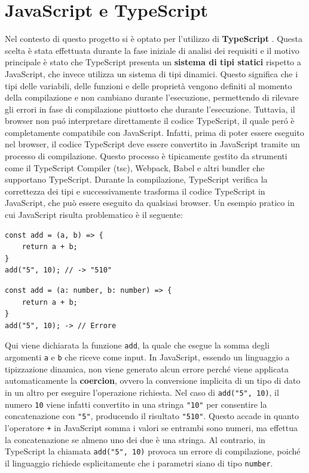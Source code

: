 \documentclass[target=bach,aauheader=,style=]{thud}
\begin{document}
\section{JavaScript e TypeScript}
Nel contesto di questo progetto si è optato per l'utilizzo di \textbf{TypeScript} \cite{wikipedia:typescript}. Questa scelta è stata effettuata durante la fase iniziale di analisi dei requisiti e il motivo principale è stato che TypeScript presenta un \textbf{sistema di tipi statici} rispetto a JavaScript, che invece utilizza un sistema di tipi dinamici. Questo significa che i tipi delle variabili, delle funzioni e delle proprietà vengono definiti al momento della compilazione e non cambiano durante l'esecuzione, permettendo di rilevare gli errori in fase di compilazione piuttosto che durante l'esecuzione. Tuttavia, il browser non puó interpretare direttamente il codice TypeScript, il quale peró è completamente compatibile con JavaScript. Infatti, prima di poter essere eseguito nel browser, il codice TypeScript deve essere convertito in JavaScript tramite un processo di compilazione. Questo processo è tipicamente gestito da strumenti come il TypeScript Compiler (tsc), Webpack, Babel e altri bundler che supportano TypeScript. Durante la compilazione, TypeScript verifica la correttezza dei tipi e successivamente trasforma il codice TypeScript in JavaScript, che può essere eseguito da qualsiasi browser. Un esempio pratico in cui JavaScript risulta problematico è il seguente: 

\begin{minipage}[t]{0.45\textwidth}
    \begin{lstlisting}[caption=Coercion in JavaScript]
const add = (a, b) => {
    return a + b;
}   
add("5", 10); // -> "510"
    \end{lstlisting}
\end{minipage}
\hfill
\begin{minipage}[t]{0.45\textwidth}
    \begin{lstlisting}[caption=Errore in TypeScript]
const add = (a: number, b: number) => {
    return a + b;
}  
add("5", 10); -> // Errore
    \end{lstlisting}
\end{minipage}

\noindent Qui viene dichiarata la funzione \texttt{add}, la quale che esegue la somma degli argomenti \texttt{a} e \texttt{b} che riceve come input. In JavaScript, essendo un linguaggio a tipizzazione dinamica, non viene generato alcun errore perché viene applicata automaticamente la \textbf{coercion}, ovvero la conversione implicita di un tipo di dato in un altro per eseguire l'operazione richiesta. Nel caso di \texttt{add("5", 10)}, il numero \texttt{10} viene infatti convertito in una stringa \texttt{"10"} per consentire la concatenazione con \texttt{"5"}, producendo il risultato \texttt{"510"}. Questo accade in quanto l'operatore \texttt{+} in JavaScript somma i valori se entrambi sono numeri, ma effettua la concatenazione se almeno uno dei due è una stringa. Al contrario, in TypeScript la chiamata \texttt{add("5", 10)} provoca un errore di compilazione, poiché il linguaggio richiede esplicitamente che i parametri siano di tipo \texttt{number}.
\end{document}
